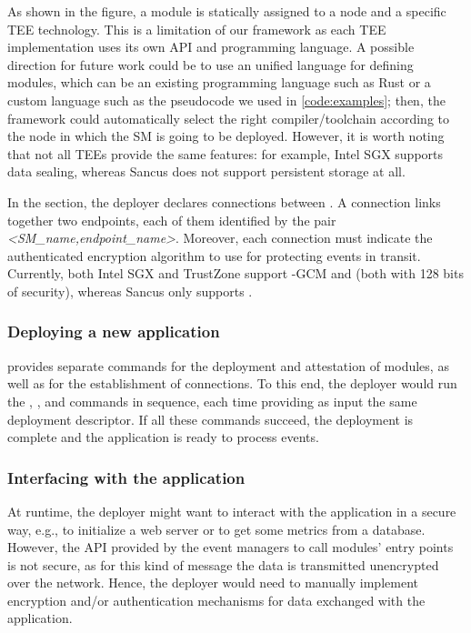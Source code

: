 As shown in the figure, a module is statically assigned to a node and a specific
\ac{TEE} technology. This is a limitation of our framework as each \ac{TEE}
implementation uses its own API and programming language. A possible direction
for future work could be to use an unified language for defining modules, which
can be an existing programming language such as Rust or a custom language such
as the pseudocode we used in \cref{code:examples}; then, the framework could
automatically select the right compiler/toolchain according to the node in which
the \ac{SM} is going to be deployed. However, it is worth noting that not all
\acp{TEE} provide the same features: for example, Intel \ac{SGX} supports data
sealing, whereas Sancus does not support persistent storage at all.

In the  section, the deployer declares connections between
\protmods. A connection links together two endpoints, each of them identified by
the pair \emph{<SM\_name,endpoint\_name>}. Moreover, each connection must
indicate the authenticated encryption algorithm to use for protecting events in
transit. Currently, both Intel \ac{SGX} and TrustZone support \aes-\ac{GCM} and
\spongent{} (both with 128 bits of security), whereas Sancus only supports
\spongent{}.

\subsubsection{Deploying a new application}

\reactools{} provides separate commands for the deployment and attestation of
modules, as well as for the establishment of connections. To this end, the
deployer would run the , , and  commands in
sequence, each time providing as input the same deployment descriptor. If all
these commands succeed, the deployment is complete and the application is ready
to process events.

\subsubsection{Interfacing with the application}
%
\label{impl-descriptor-interfacing}

At runtime, the deployer might want to interact with the application in a secure
way, e.g., to initialize a web server or to get some metrics from a database.
However, the \callentry{} API provided by the event managers to call modules'
entry points is not secure, as for this kind of message the data is transmitted
unencrypted over the network. Hence, the deployer would need to manually
implement encryption and/or authentication mechanisms for data exchanged with
the application.

